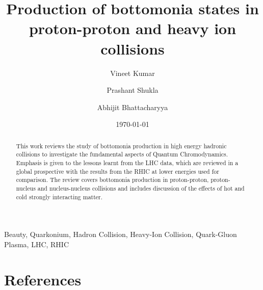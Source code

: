 \documentclass[review]{elsarticle}
\begin{document}
\fontsize{11}{15}
\selectfont

\begin{frontmatter}
  \title{Production of bottomonia states in proton-proton and heavy ion collisions}
  \author[NPD]{Vineet Kumar}
  \author[NPD,HBNI]{Prashant Shukla}
  \author[UOC]{Abhijit Bhattacharyya}
  \address[NPD]{Nuclear Physics Division, Bhabha Atomic Research Centre, Mumbai 400085, India}
  \address[UOC]{Department of Physics, University of Calcutta, 92, A. P. C. Road Kolkata-700009, India}
  \address[HBNI]{Homi Bhabha National Institute, Anushakti Nagar, Mumbai 400094, India}
  \date{\today}
  
  \begin{abstract}
    
    This work reviews the study of bottomonia production in high energy hadronic collisions to investigate
    the fundamental aspects of Quantum Chromodynamics. Emphasis is given to the lessons learnt from the LHC
    data, which are reviewed in a global prospective with the results from the RHIC at lower energies used
    for comparison. The review covers bottomonia production in proton-proton, proton-nucleus and nucleus-nucleus
    collisions and includes discussion of the effects of hot and cold strongly interacting matter.

  \end{abstract}
  
  \begin{keyword}
    Beauty, Quarkonium, Hadron Collision, Heavy-Ion Collision, Quark-Gluon Plasma, LHC, RHIC
  \end{keyword}
  


  

\maketitle

\tableofcontents


\end{frontmatter}








\section*{References}

\end{document}
